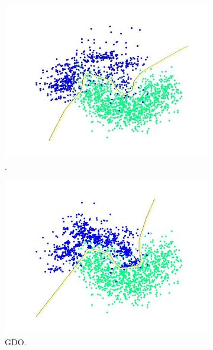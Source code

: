 \begin{figure}[th]
	\centering
	\begin{subfigure}[]{0.3\linewidth}
		\includegraphics[width=\linewidth]{Figures/moon/Training_Data_PLot_SIMPOR}
		\caption{\Methodname{}.}
		\label{fig:simpor_moon}
	\end{subfigure}
	\hspace{0.1em}%
	\begin{subfigure}[]{0.3\linewidth}
		\includegraphics[width=\linewidth]{Figures/moon/Training_Data_PLot_GDO}
		\caption{GDO.}
		\label{fig:gdo_moon}
	\end{subfigure}
	\hspace{0.1em}%
	\begin{subfigure}[]{0.3\linewidth}

\end{subfigure}
\end{figure}
